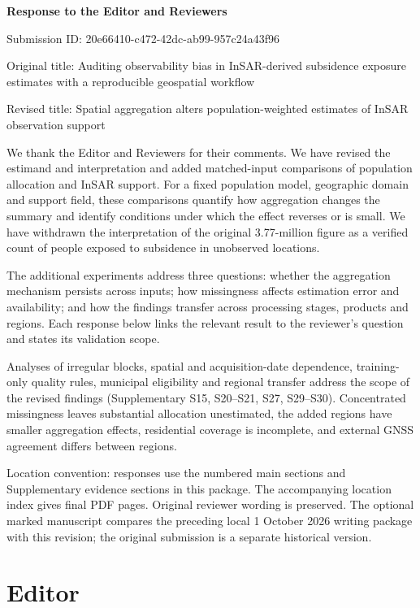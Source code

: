 \documentclass[11pt,a4paper]{article}
\begin{document}
\begin{center}\LARGE\bfseries Response to the Editor and Reviewers\end{center}\vspace{1em}

Submission ID: 20e66410-c472-42dc-ab99-957c24a43f96

Original title: Auditing observability bias in InSAR-derived subsidence exposure estimates with a reproducible geospatial workflow

Revised title: Spatial aggregation alters population-weighted estimates of InSAR observation support

We thank the Editor and Reviewers for their comments. We have revised the estimand and interpretation and added matched-input comparisons of population allocation and InSAR support. For a fixed population model, geographic domain and support field, these comparisons quantify how aggregation changes the summary and identify conditions under which the effect reverses or is small. We have withdrawn the interpretation of the original 3.77-million figure as a verified count of people exposed to subsidence in unobserved locations.

The additional experiments address three questions: whether the aggregation mechanism persists across inputs; how missingness affects estimation error and availability; and how the findings transfer across processing stages, products and regions. Each response below links the relevant result to the reviewer's question and states its validation scope.

Analyses of irregular blocks, spatial and acquisition-date dependence, training-only quality rules, municipal eligibility and regional transfer address the scope of the revised findings (Supplementary S15, S20--S21, S27, S29--S30). Concentrated missingness leaves substantial allocation unestimated, the added regions have smaller aggregation effects, residential coverage is incomplete, and external GNSS agreement differs between regions.

Location convention: responses use the numbered main sections and Supplementary evidence sections in this package. The accompanying location index gives final PDF pages. Original reviewer wording is preserved. The optional marked manuscript compares the preceding local 1 October 2026 writing package with this revision; the original submission is a separate historical version.

\section*{Editor}
\end{document}
